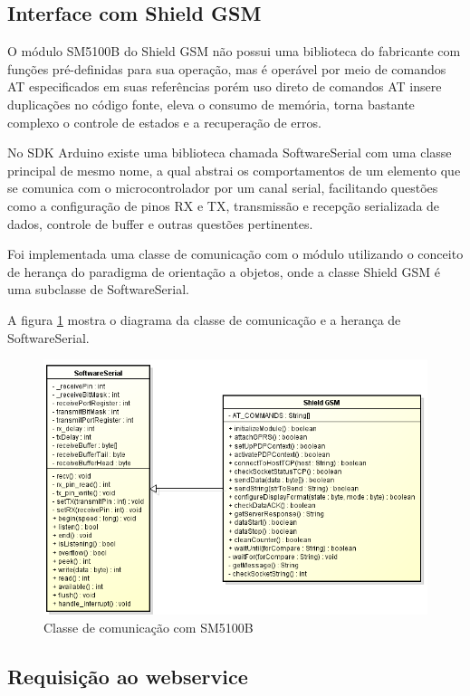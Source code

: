 \newpage
\subsection{Interface com Shield GSM}

O módulo SM5100B do Shield GSM não possui uma biblioteca do fabricante com funções pré-definidas para sua operação, mas é operável por meio de comandos AT especificados em suas referências porém uso direto de comandos AT insere duplicações no código fonte, eleva o consumo de memória, torna bastante complexo o controle de estados e a recuperação de erros.

No SDK Arduino existe uma biblioteca chamada SoftwareSerial com uma classe principal de mesmo nome, a qual abstrai os comportamentos de um elemento que se comunica com o microcontrolador por um canal serial, facilitando questões como a configuração de pinos RX e TX, transmissão e recepção serializada de dados, controle de buffer e outras questões pertinentes.

Foi implementada uma classe de comunicação com o módulo utilizando o conceito de herança do paradigma de orientação a objetos, onde a classe Shield GSM é uma subclasse de SoftwareSerial. 

A figura \ref{fig:classesm} mostra o diagrama da classe de comunicação e a herança de SoftwareSerial.

\begin{figure}[!htb]
	\centering
	\includegraphics[width=\textwidth]{figures/lib_gsm.png}
	\caption{Classe de comunicação com SM5100B}
	\label{fig:classesm}
\end{figure}

\subsection{Requisição ao webservice}

